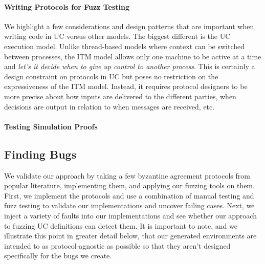 \paragraph{Writing Protocols for Fuzz Testing}
We highlight a few considerations and design patterns that are important when writing code in UC versus other models.
The biggest different is the UC execution model. 
Unlike thread-based models where context can be switched between processes, the ITM model allows only one machine to be active at a time and \emph{let's it decide when to give up control to another process}.
This is certainly a design constraint on protocols in UC but poses no restriction on the expressiveness of the ITM model.
Instead, it requires protocol designers to be more precise about how inputs are delivered to the different parties, when decisions are output in relation to when messages are received, etc. 



\paragraph{Testing Simulation Proofs}
\todo{}

\subsection{Finding Bugs}
We validate our approach by taking a few byzantine agreement protocols from popular literature, implementing them, and applying our fuzzing tools on them. 
First, we implement the protocols and use a combination of manual testing and fuzz testing to validate our implementations and uncover failing cases. 
Next, we inject a variety of faults into our implementations and see whether our approach to fuzzing UC definitions can detect them.
It is important to note, and we illustrate this point in greater detail below, that our generated environments are intended to as protocol-agnostic as possible so that they aren't designed specifically for the bugs we create.

